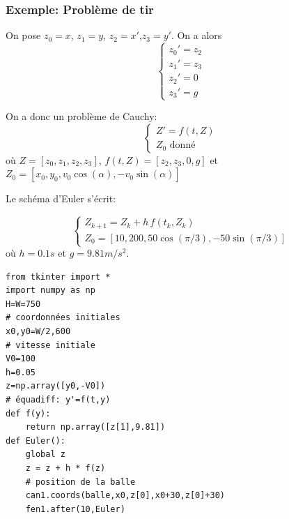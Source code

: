 \documentclass{beamer}
\begin{document}
 \begin{frame}
 \frametitle{Exemple: Problème de tir}
  

  On pose $z_0=x$, $z_1=y$, $z_2=x'$,$z_3=y'$. On a alors
  \[\left\{\begin{array}{l}
  z_0'=z_2\\
  z_1'=z_3\\
  z_2'=0\\
  z_3'=g
  \end{array}\right.\]
  
     On a donc un problème de Cauchy:
  \[\left\{\begin{array}{l}
  Z'=f(t,Z)\\
  Z_0 \mbox{ donné}
  \end{array}\right.\]
  où $Z=[z_0,z_1,z_2,z_3]$, $f(t,Z)=[z_2,z_3,0,g]$ et $Z_0=[x_0,y_0,v_0\cos(\alpha),-v_0\sin(\alpha)]$
  
  Le schéma d'Euler s'écrit:
  
  \[\left\{\begin{array}{l}
  Z_{k+1}=Z_k+h\,f(t_k,Z_k)\\
  Z_0 =[10,200,50\cos(\pi/3),-50\sin(\pi/3)]
  \end{array}\right.\]
  où $h=0.1s$ et $g=9.81 m/s^2$.
  
  
  
\end{frame}


\begin{frame}[fragile]

\begin{verbatim}
from tkinter import *
import numpy as np
H=W=750
# coordonnées initiales
x0,y0=W/2,600
# vitesse initiale
V0=100
h=0.05
z=np.array([y0,-V0])
# équadiff: y'=f(t,y)
def f(y):
    return np.array([z[1],9.81])
def Euler():
    global z
    z = z + h * f(z)
    # position de la balle
    can1.coords(balle,x0,z[0],x0+30,z[0]+30)
    fen1.after(10,Euler)

\end{verbatim}
\end{frame}
\end{document}
